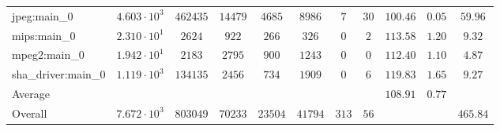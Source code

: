 \begin{tabular}{|l|c|c|c|c|c|c|c|c|c|c|}
jpeg:main\_0            & $ 4.603 \cdot 10^{3}  $ & $ 462435 $ & $ 14479 $ & $ 4685  $ & $ 8986  $ & $ 7   $ & $ 30 $ & $ 100.46      $ & $ 0.05    $ & $ 59.96   $ \\
mips:main\_0            & $ 2.310 \cdot 10^{1}  $ & $ 2624   $ & $ 922   $ & $ 266   $ & $ 326   $ & $ 0   $ & $ 2  $ & $ 113.58      $ & $ 1.20    $ & $ 9.32    $ \\
mpeg2:main\_0           & $ 1.942 \cdot 10^{1}  $ & $ 2183   $ & $ 2795  $ & $ 900   $ & $ 1243  $ & $ 0   $ & $ 0  $ & $ 112.40      $ & $ 1.10    $ & $ 4.87    $ \\
sha\_driver:main\_0     & $ 1.119 \cdot 10^{3}  $ & $ 134135 $ & $ 2456  $ & $ 734   $ & $ 1909  $ & $ 0   $ & $ 6  $ & $ 119.83      $ & $ 1.65    $ & $ 9.27    $ \\
\hline
Average                 & $                     $ & $        $ & $       $ & $       $ & $       $ & $     $ & $    $ & $ 108.91      $ & $ 0.77    $ & $         $ \\
\hline
Overall                 & $ 7.672 \cdot 10^{3}  $ & $ 803049 $ & $ 70233 $ & $ 23504 $ & $ 41794 $ & $ 313 $ & $ 56 $ & $             $ & $         $ & $ 465.84  $ \\
\hline
\end{tabular}
